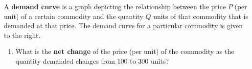 \documentclass[10pt]{article}
\begin{document}
\begin{minipage}[t]{0.75\textwidth}
 A {\bf demand curve} is a graph depicting the relationship between the price $P$ (per unit) of a certain commodity and the quantity $Q$ units of that commodity that is demanded at that price. The demand curve for a particular commodity is given to the right.

\begin{enumerate}
\item[(a)] What is the {\bf net change} of the price (per unit) of the commodity as the quantity demanded changes from $100$ to $300$ units?
\end{enumerate}

\end{minipage}
%
\hfill
%
\begin{minipage}[t]{0.2\textwidth}
\begin{center}
\end{center}
\end{minipage}

\vfill\vspace{-0.5in}
\end{document}
